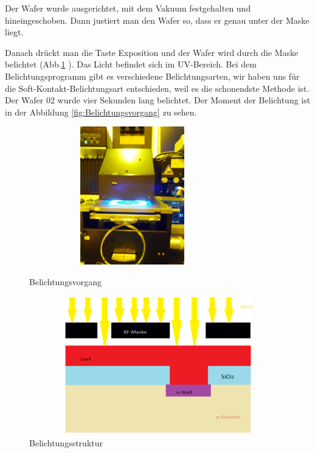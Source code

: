 Der Wafer wurde ausgerichtet, mit dem Vakuum festgehalten und hineingeschoben. Dann justiert man den Wafer so, dass er genau unter der Maske liegt.

Danach drückt man die Taste Exposition und der Wafer wird durch die Maske
belichtet (Abb.\ref{fig:DerMomentderBelichtung } ). Das Licht befindet sich im UV-Bereich.  Bei dem Belichtungsprogramm gibt es verschiedene Belichtungsarten, wir haben uns für die Soft-Kontakt-Belichtungsart entschieden, weil es die schonendste Methode ist. Der Wafer 02 wurde vier Sekunden lang
belichtet. Der Moment der Belichtung ist in der Abbildung \ref{fig:Belichtungsvorgang} zu sehen.


\begin{figure}[H]
\centering
\begin{minipage}[hbt]{6cm}
    \centering
    \includegraphics[width=0.8\textwidth, height=6cm]{bilder/Belichtungsvorgang.png}
  \caption{Belichtungsvorgang}
  \label{fig:Belichtungsvorgang}
\end{minipage}
\begin{minipage}[hbt]{6cm}
    \centering
    \includegraphics[width=1\textwidth,height=6cm]{bilder/DerMomentderBelichtung.png}
  \caption{ Belichtungsstruktur }
  \label{fig:DerMomentderBelichtung }
\end{minipage}

\end{figure}


